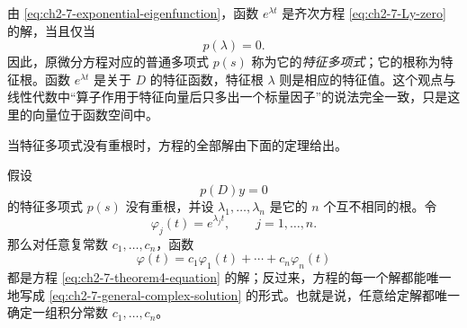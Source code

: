 由 \eqref{eq:ch2-7-exponential-eigenfunction}，函数 \(e^{\lambda t}\) 是齐次方程 \eqref{eq:ch2-7-Ly-zero} 的解，当且仅当
\[
 p(\lambda)=0.
\]
因此，原微分方程对应的普通多项式 \(p(s)\) 称为它的\emph{特征多项式}；它的根称为特征根。函数 \(e^{\lambda t}\) 是关于 \(D\) 的特征函数，特征根 \(\lambda\) 则是相应的特征值。这个观点与线性代数中“算子作用于特征向量后只多出一个标量因子”的说法完全一致，只是这里的向量位于函数空间中。

当特征多项式没有重根时，方程的全部解由下面的定理给出。

\begin{theorem}[单根情形的基本解组]
\label{thm:ch2-4-simple-roots}
 假设
 \begin{equation}
  p(D)y=0
  \label{eq:ch2-7-theorem4-equation}
 \end{equation}
 的特征多项式 \(p(s)\) 没有重根，并设 \(\lambda_1,\ldots,\lambda_n\) 是它的 \(n\) 个互不相同的根。令
 \begin{equation}
  \varphi_j(t)=e^{\lambda_jt},
  \qquad j=1,\ldots,n.
  \label{eq:ch2-7-simple-fundamental-functions}
 \end{equation}
  那么对任意复常数 \(c_1,\ldots,c_n\)，函数
 \begin{equation}
  \varphi(t)=c_1\varphi_1(t)+\cdots+c_n\varphi_n(t)
  \label{eq:ch2-7-general-complex-solution}
 \end{equation}
  都是方程 \eqref{eq:ch2-7-theorem4-equation} 的解；反过来，方程的每一个解都能唯一地写成 \eqref{eq:ch2-7-general-complex-solution} 的形式。也就是说，任意给定解都唯一确定一组积分常数 \(c_1,\ldots,c_n\)。
\end{theorem}

